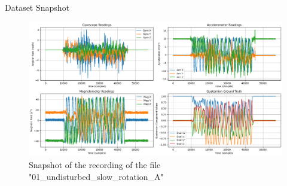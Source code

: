 \documentclass[aspectratio=169,xcolor=dvipsnames]{beamer}
\begin{document}
\begin{frame}{Dataset Snapshot}
\hfill
\begin{figure}
    \centering
    \includegraphics[width=0.55\linewidth]{logos/dataset_snapshot.png}
    \caption{Snapshot of the recording of the file "01_undisturbed_slow_rotation_A"}
    \label{fig:imuapp}
\end{figure}
\hfill
\end{frame}
\end{document}
